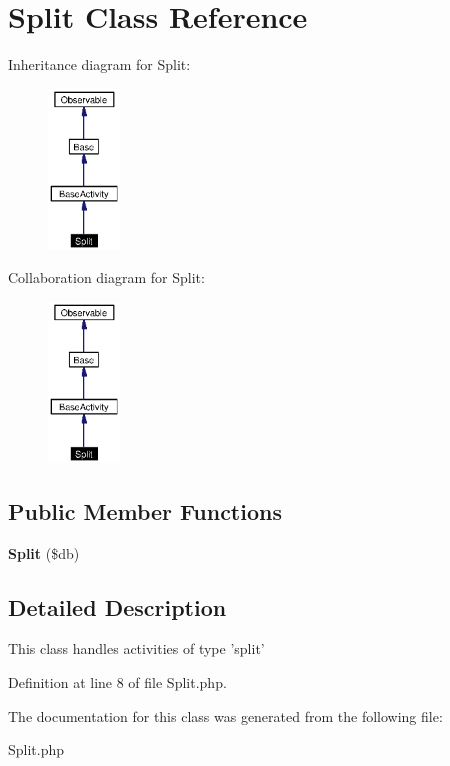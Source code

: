 \section{Split Class Reference}
\label{classSplit}
Inheritance diagram for Split:\begin{figure}[H]
\begin{center}
\leavevmode
\includegraphics[width=54pt]{classSplit__inherit__graph}
\end{center}
\end{figure}
Collaboration diagram for Split:\begin{figure}[H]
\begin{center}
\leavevmode
\includegraphics[width=54pt]{classSplit__coll__graph}
\end{center}
\end{figure}
\subsection*{Public Member Functions}
\begin{CompactItemize}
\item 
{\bf Split} (\$db)\label{classSplit_a0}

\end{CompactItemize}


\subsection{Detailed Description}
This class handles activities of type 'split' 



Definition at line 8 of file Split.php.

The documentation for this class was generated from the following file:\begin{CompactItemize}
\item 
Split.php\end{CompactItemize}
